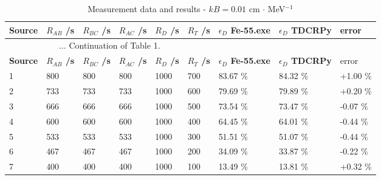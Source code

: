 \documentclass[12pt]{iopart}
\begin{document}
\begingroup
\footnotesize
\begin{longtable}[l]{| p{} | p{} | p{} | p{} | p{} | p{} |p{} |p{} |p{} |} 
\caption{Measurement data and results - $kB = 0.01$ cm $\cdot$ MeV$^{-1}$}
\label{Table1} \\ 
\hline
\textbf{Source} & \textbf{$R_{AB}$ /s} & \textbf{$R_{BC}$ /s} & \textbf{$R_{AC}$ /s} & \textbf{$R_{D}$ /s} & \textbf{$R_{T}$ /s} & \textbf{$\epsilon_{D}$ Fe-55.exe} & \textbf{$\epsilon_{D}$ TDCRPy} & error \\ 
\endfirsthead
\multicolumn{6}{c}{... Continuation of Table 1.}\\ 
\hline
 \textbf{Source} & \textbf{$R_{AB}$ /s} & \textbf{$R_{BC}$ /s} & \textbf{$R_{AC}$ /s} & \textbf{$R_{D}$ /s} & \textbf{$R_{T}$ /s} & \textbf{$\epsilon_{D}$ Fe-55.exe} & \textbf{$\epsilon_{D}$ TDCRPy} & error \\   \hline 
\endhead
\hline
 1 & 800    & 800     & 800    & 1000    &  700   & 83.67 \% & 84.32 \% & +1.00 \% \\
 2 & 733    & 733     & 733    & 1000    &  600   & 79.69 \% & 79.89 \% & +0.20 \% \\
 3 & 666    & 666     & 666    & 1000    &  500   & 73.54 \% & 73.47 \% & -0.07 \% \\
 4 & 600    & 600     & 600    & 1000    &  400   & 64.45 \% & 64.01 \% & -0.44 \% \\
 5 & 533    & 533     & 533    & 1000    &  300   & 51.51 \% & 51.07 \% & -0.44 \% \\
 6 & 467    & 467     & 467    & 1000    &  200   & 34.09 \% & 33.87 \% & -0.22 \% \\
 7 & 400    & 400     & 400    & 1000    &  100   & 13.49 \% & 13.81 \% & +0.32 \% \\
\hline
\end{longtable} 
\endgroup
\end{document}
